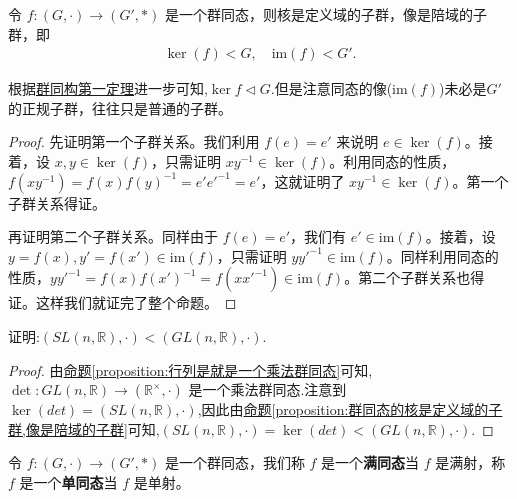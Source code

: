 \documentclass[../../main.tex]{subfiles}
\begin{document}
\begin{proposition}\label{proposition:群同态的核是定义域的子群,像是陪域的子群}
令 $f:(G,\cdot)\to (G',*)$ 是一个群同态，则核是定义域的子群，像是陪域的子群，即
\begin{align*}
\ker(f) < G,\quad
\mathrm{im}(f) < G'.
\end{align*}
\end{proposition}
\begin{remark}
根据\hyperref[theorem:群同构第一定理]{群同构第一定理}进一步可知,$\ker f \lhd G$.但是注意同态的像($\mathrm{im}(f)$)未必是$G'$的正规子群，往往只是普通的子群。
\end{remark}
\begin{proof}
先证明第一个子群关系。我们利用 $f(e)=e'$ 来说明 $e\in\ker(f)$。接着，设 $x,y\in\ker(f)$，只需证明 $xy^{-1}\in\ker(f)$。利用同态的性质，$f(xy^{-1}) = f(x)f(y)^{-1}=e'e'^{-1}=e'$，这就证明了 $xy^{-1}\in\ker(f)$。第一个子群关系得证。

再证明第二个子群关系。同样由于 $f(e)=e'$，我们有 $e'\in\mathrm{im}(f)$。接着，设 $y = f(x),y' = f(x')\in\mathrm{im}(f)$，只需证明 $yy'^{-1}\in\mathrm{im}(f)$。同样利用同态的性质，$yy'^{-1}=f(x)f(x')^{-1}=f(xx'^{-1})\in\mathrm{im}(f)$。第二个子群关系也得证。这样我们就证完了整个命题。
\end{proof}

\begin{example}
证明:$(SL(n,\mathbb{R}),\cdot)<(GL(n,\mathbb{R}),\cdot)$.
\end{example}
\begin{proof}
由\hyperref[proposition:行列是就是一个乘法群同态]{命题\ref{proposition:行列是就是一个乘法群同态}}可知,$\det : GL(n, \mathbb{R}) \to (\mathbb{R}^\times, \cdot)$ 是一个乘法群同态.注意到$\ker (det)=(SL(n,\mathbb{R}),\cdot)$,因此由\hyperref[proposition:群同态的核是定义域的子群,像是陪域的子群]{命题\ref{proposition:群同态的核是定义域的子群,像是陪域的子群}}可知,$(SL(n,\mathbb{R}),\cdot)=\ker (det)<(GL(n,\mathbb{R}),\cdot)$.
\end{proof}

\begin{definition}[满同态与单同态]
令 $f:(G,\cdot)\to (G',*)$ 是一个群同态，我们称 $f$ 是一个\textbf{满同态}当 $f$ 是满射，称 $f$ 是一个\textbf{单同态}当 $f$ 是单射。 
\end{definition}
\end{document}
